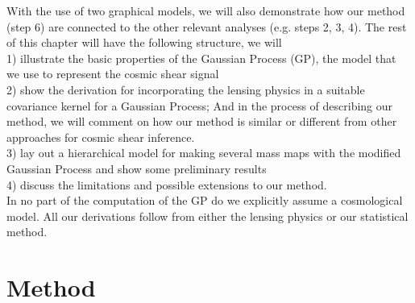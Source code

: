 With the use of two graphical models, we will also demonstrate how our method
(step 6) are connected to the other relevant analyses (e.g. steps 2, 3, 4). 
The rest of this chapter will have the following structure, we will \\ 
1) illustrate the basic properties of the Gaussian Process (GP), the model that we
use to represent the cosmic shear signal\\ 
2) show the derivation for incorporating the lensing physics in 
a suitable covariance kernel for a Gaussian Process;  
And in the process of describing our method, we will comment on how our method is  
similar or different from other approaches for cosmic shear inference. \\
3) lay out a hierarchical model for making several mass maps 
with the modified Gaussian Process and show some preliminary results \\ 
4) discuss the limitations and possible extensions to our method.\\
In no part of the computation of the GP do we explicitly assume a cosmological model. All our
derivations follow from either the lensing physics or our statistical method.   


\section{Method}


